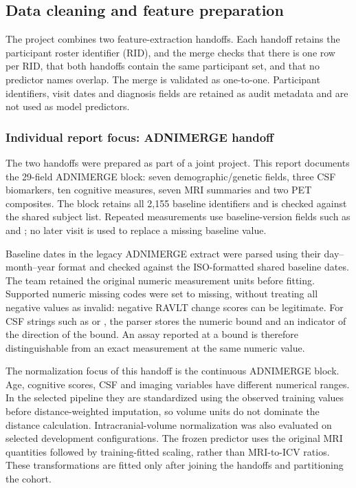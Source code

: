 \documentclass[11pt,a4paper]{article}
\newcommand{\field}[1]{\texttt{\detokenize{#1}}}
\begin{document}
\subsection{Data cleaning and feature preparation}
The project combines two feature-extraction handoffs. Each handoff retains the participant roster identifier (RID), and the merge checks that there is one row per RID, that both handoffs contain the same participant set, and that no predictor names overlap. The merge is validated as one-to-one. Participant identifiers, visit dates and diagnosis fields are retained as audit metadata and are not used as model predictors.

\subsubsection*{Individual report focus: ADNIMERGE handoff}
The two handoffs were prepared as part of a joint project. This report documents the 29-field ADNIMERGE block: seven demographic/genetic fields, three CSF biomarkers, ten cognitive measures, seven MRI summaries and two PET composites. The block retains all 2,155 baseline identifiers and is checked against the shared subject list. Repeated measurements use baseline-version fields such as \field{MMSE_bl} and \field{Hippocampus_bl}; no later visit is used to replace a missing baseline value.

Baseline dates in the legacy ADNIMERGE extract were parsed using their day--month--year format and checked against the ISO-formatted shared baseline dates. The team retained the original numeric measurement units before fitting. Supported numeric missing codes were set to missing, without treating all negative values as invalid: negative RAVLT change scores can be legitimate. For CSF strings such as \field{>1700} or \field{<80}, the parser stores the numeric bound and an indicator of the direction of the bound. An assay reported at a bound is therefore distinguishable from an exact measurement at the same numeric value.

The normalization focus of this handoff is the continuous ADNIMERGE block. Age, cognitive scores, CSF and imaging variables have different numerical ranges. In the selected pipeline they are standardized using the observed training values before distance-weighted imputation, so volume units do not dominate the distance calculation. Intracranial-volume normalization was also evaluated on selected development configurations. The frozen predictor uses the original MRI quantities followed by training-fitted scaling, rather than MRI-to-ICV ratios. These transformations are fitted only after joining the handoffs and partitioning the cohort.
\end{document}
